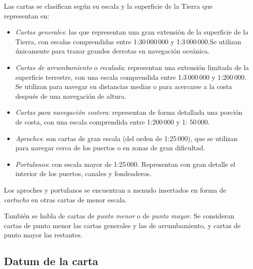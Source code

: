 
Las cartas se clasifican según su escala y la superficie de la Tierra que representan en: 
\begin{itemize}
\item \emph{Cartas generales}: las que representan una gran extensión de la superficie de la 
Tierra, con escalas comprendidas entre 1:30\,000\,000 y 1:3\,000\,000.Se utilizan 
únicamente para trazar grandes derrotas en navegación oceánica. 
\item \emph{Cartas de arrumbamiento} o \emph{recalada}: representan una extensión limitada de la 
superficie terrestre, con una escala comprendida entre 1:3\,000\,000 y 1:200\,000. 
Se utilizan para navegar en distancias medias o para acercarse a la costa después 
de una navegación de altura. 
\item \emph{Cartas para navegación costera}: representan de forma detallada una porción de 
costa, con una escala comprendida entre 1:200\,000 y 1: 50\,000. 
\item \emph{Aproches}: son cartas de gran escala (del orden de 1:25\,000), que se utilizan para 
navegar cerca de los puertos o en zonas de gran dificultad. 
\item  \emph{Portulanos}: con escala mayor de 1:25\,000. Representan con gran detalle el interior 
de los puertos, canales y fondeaderos. 
\end{itemize}
Los aproches y portulanos se encuentran a menudo insertados en forma de 
\emph{cartucho} en otras cartas de menor escala. 


También se habla de cartas de \emph{punto menor} o de \emph{punto mayor}. Se consideran cartas de 
punto menor las cartas generales y las de arrumbamiento, y cartas de punto mayor las restantes. 

\subsection{Datum de la carta} 


 
